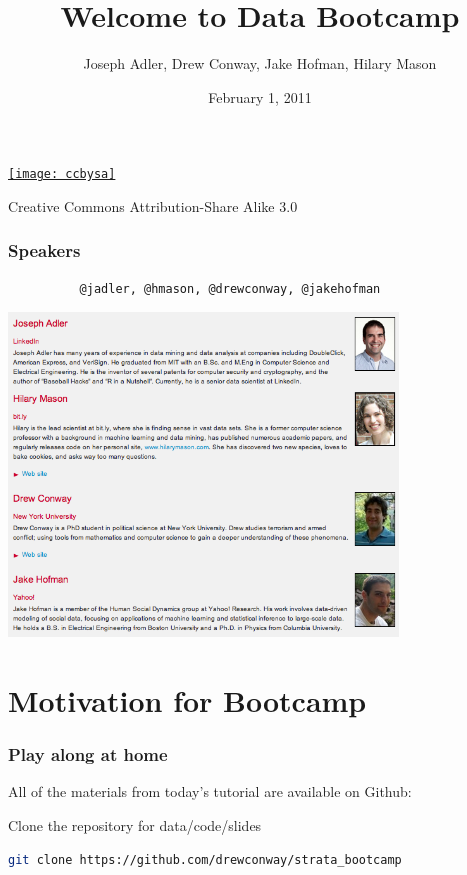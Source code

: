 \documentclass[xcolor=dvipsnames, 9pt]{beamer}
\title{Welcome to Data Bootcamp}
\author{Joseph Adler, Drew Conway, Jake Hofman, Hilary Mason}
\date{February 1, 2011}
\begin{document}
 
    
\begin{frame}[plain]
  \titlepage 

  \tiny
  \href{http://creativecommons.org/licenses/by-sa/3.0/us/}{\texttt{[image: ccbysa]}}

  Creative Commons Attribution-Share Alike 3.0
\end{frame}


\begin{frame}[fragile]
    \frametitle{Speakers}
\begin{verbatim}
          @jadler, @hmason, @drewconway, @jakehofman
\end{verbatim}
    \vskip5pt
    \begin{center}
        \includegraphics[width=0.775\textwidth]{speakers.png} \\
    \end{center}
\end{frame}


\section{Motivation for Bootcamp} %
\label{sec:motivation_for_bootcamp}

\begin{frame}[fragile]
    \frametitle{Play along at home}
    All of the materials from today's tutorial are available on Github:
    \vskip20pt
    \begin{block}{Clone the repository for data/code/slides}
        \begin{lstlisting}[language=bash]
git clone https://github.com/drewconway/strata_bootcamp
        \end{lstlisting}
    \end{block}
\end{frame}
\end{document}
